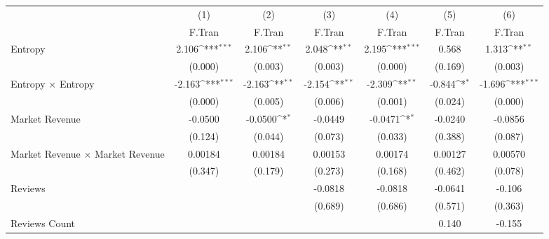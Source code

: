 {
\def\sym#1{\ifmmode^{#1}\else\(^{#1}\)\fi}
\begin{tabular}{l*{6}{c}}
\hline\hline
                    &\multicolumn{1}{c}{(1)}&\multicolumn{1}{c}{(2)}&\multicolumn{1}{c}{(3)}&\multicolumn{1}{c}{(4)}&\multicolumn{1}{c}{(5)}&\multicolumn{1}{c}{(6)}\\
                    &\multicolumn{1}{c}{F.Tran}&\multicolumn{1}{c}{F.Tran}&\multicolumn{1}{c}{F.Tran}&\multicolumn{1}{c}{F.Tran}&\multicolumn{1}{c}{F.Tran}&\multicolumn{1}{c}{F.Tran}\\
\hline
Entropy             &       2.106\sym{***}&       2.106\sym{**} &       2.048\sym{**} &       2.195\sym{***}&       0.568         &       1.313\sym{**} \\
                    &     (0.000)         &     (0.003)         &     (0.003)         &     (0.000)         &     (0.169)         &     (0.003)         \\
[1em]
Entropy $\times$ Entropy&      -2.163\sym{***}&      -2.163\sym{**} &      -2.154\sym{**} &      -2.309\sym{**} &      -0.844\sym{*}  &      -1.696\sym{***}\\
                    &     (0.000)         &     (0.005)         &     (0.006)         &     (0.001)         &     (0.024)         &     (0.000)         \\
[1em]
Market Revenue      &     -0.0500         &     -0.0500\sym{*}  &     -0.0449         &     -0.0471\sym{*}  &     -0.0240         &     -0.0856         \\
                    &     (0.124)         &     (0.044)         &     (0.073)         &     (0.033)         &     (0.388)         &     (0.087)         \\
[1em]
Market Revenue $\times$ Market Revenue&     0.00184         &     0.00184         &     0.00153         &     0.00174         &     0.00127         &     0.00570         \\
                    &     (0.347)         &     (0.179)         &     (0.273)         &     (0.168)         &     (0.462)         &     (0.078)         \\
[1em]
Reviews             &                     &                     &     -0.0818         &     -0.0818         &     -0.0641         &      -0.106         \\
                    &                     &                     &     (0.689)         &     (0.686)         &     (0.571)         &     (0.363)         \\
[1em]
Reviews Count       &                     &                     &                     &                     &       0.140         &      -0.155         \\

\end{tabular}}
